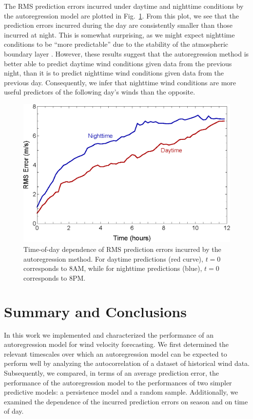 \documentclass[11pt, oneside]{article}
\newcommand{\figref}[1]{Fig.~\ref{#1}}
\begin{document}
The RMS prediction errors incurred under daytime and nighttime conditions by the autoregression model are plotted in \figref{fig:DiurnalRMS}.
From this plot, we see that the prediction errors incurred during the day are consistently smaller than those incurred at night.
This is somewhat surprising, as we might expect nighttime conditions to be ``more predictable'' due to the stability of the atmospheric boundary layer \citep[Fig.~1.7]{Stull1988}.
However, these results suggest that the autoregression method is better able to predict daytime wind conditions given data from the previous night, than it is to predict nighttime wind conditions given data from the previous day.
Consequently, we infer that nighttime wind conditions are more useful predictors of the following day's winds than the opposite.

\begin{figure}[htb]
\centering
\includegraphics[width=0.7\columnwidth]{figures/DiurnalRMSPredictionError}
\caption{Time-of-day dependence of RMS prediction errors incurred by the autoregression method.
For daytime predictions (red curve), $t = 0$ corresponds to 8AM, while for nighttime predictions (blue), $t = 0$ corresponds to 8PM.}
\label{fig:DiurnalRMS}
\end{figure}

\section{Summary and Conclusions}\label{sec:Conclusions}
In this work we implemented and characterized the performance of an autoregression model for wind velocity forecasting.
We first determined the relevant timescales over which an autoregression model can be expected to perform well by analyzing the autocorrelation of a dataset of historical wind data.
Subsequently, we compared, in terms of an average prediction error, the performance of the autoregression model to the performances of two simpler predictive models: a persistence model and a random sample.
Additionally, we examined the dependence of the incurred prediction errors on season and on time of day.
\end{document}
